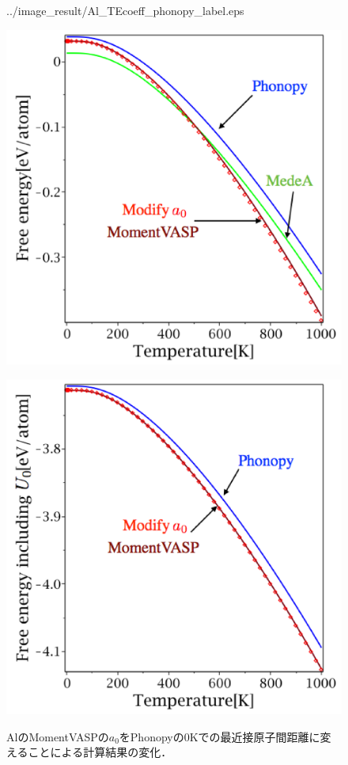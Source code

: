 \begin{figure}[htbp]
\begin{minipage}[b]{0.5\linewidth}
  {../image_result/Al_TEcoeff_phonopy_label.eps}
  \label{a0test2}
 \end{minipage}
 \hspace{10cm}
 \begin{minipage}[b]{0.5\linewidth}
  \centering
  \includegraphics[keepaspectratio, scale=0.42]
  {../image_result/Al_free_phonopy_label.eps}
  \label{a0test3}
 \end{minipage}
 \begin{minipage}[b]{0.5\linewidth}
  \centering
  \includegraphics[keepaspectratio, scale=0.42]
  {../image_result/Al_free_u0_phonopy_label.eps}
  \label{a0test4}
 \end{minipage}
 \caption{AlのMomentVASPの$a_0$をPhonopyの0Kでの最近接原子間距離に変えることによる計算結果の変化．}\label{fig:a0test}
\end{figure}
